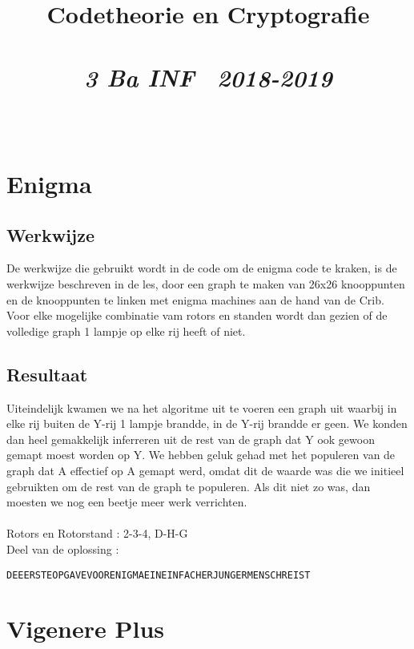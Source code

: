 \documentclass{article}
\title{\textmd{\textbf{Codetheorie en Cryptografie}}\\\normalsize\vspace{0.1in}\Large{\assignmentname}\\\vspace{0.1in}\small{\textit{3 Ba INF \  2018-2019}}}
\author{\studentA \\ \studentB}
\begin{document}
\maketitle
\section{Enigma}
\subsection{Werkwijze}
De werkwijze die gebruikt wordt in de code om de enigma code te kraken, is de werkwijze beschreven in de les, door een graph te maken van 26x26 knooppunten en de knooppunten te linken met enigma machines aan de hand van de Crib. Voor elke mogelijke combinatie vam rotors en standen wordt dan gezien of de volledige graph 1 lampje op elke rij heeft of niet.\\

\subsection{Resultaat}
Uiteindelijk kwamen we na het algoritme uit te voeren een graph uit waarbij in elke rij buiten de Y-rij 1 lampje brandde, in de Y-rij brandde er geen. We konden dan heel gemakkelijk inferreren uit de rest van de graph dat Y ook gewoon gemapt moest worden op Y. We hebben geluk gehad met het populeren van de graph dat A effectief op A gemapt werd, omdat dit de waarde was die we initieel gebruikten om de rest van de graph te populeren. Als dit niet zo was, dan moesten we nog een beetje meer werk verrichten. \\ \\
Rotors en Rotorstand : 2-3-4, D-H-G \\
Deel van de oplossing : 
\begin{verbatim}
DEEERSTEOPGAVEVOORENIGMAEINEINFACHERJUNGERMENSCHREIST 
\end{verbatim} 

\section{Vigenere Plus}
\end{document}
